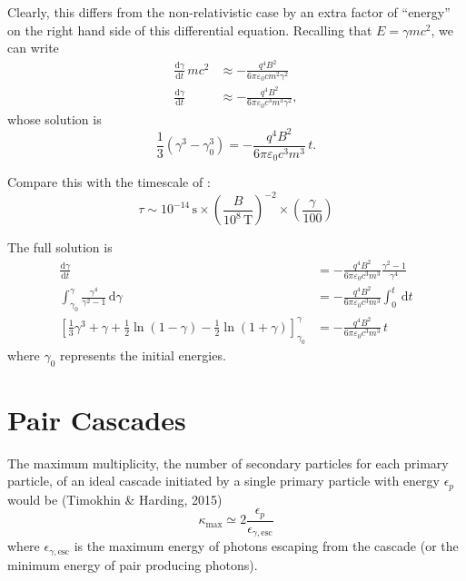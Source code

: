 \documentclass{book}
\newcommand{\deriv}[2]{\frac{\text{d}{#1}}{\text{d}{#2}}}
\begin{document}
Clearly, this differs from the non-relativistic case by an extra factor of ``energy'' on the right hand side of this differential equation.
Recalling that $E = \gamma mc^2$, we can write
\begin{equation}
\begin{aligned}
    \deriv{\gamma}{t}\,mc^2 &\approx -\frac{q^4B^2}{6\pi\varepsilon_0 c m^2 \gamma^2} \\
    \deriv{\gamma}{t} &\approx -\frac{q^4B^2}{6\pi\varepsilon_0 c^3 m^3 \gamma^2},
\end{aligned}
\end{equation}
whose solution is
\begin{equation}
    \frac{1}{3}(\gamma^3 - \gamma_0^3) = -\frac{q^4B^2}{6\pi\varepsilon_0 c^3 m^3}\,t.
\end{equation}

Compare this with the timescale of \citet{Luo1998}:
\begin{equation}
    \tau \sim 10^{-14}\,\text{s}
        \times \left(\frac{B}{10^8\,\text{T}}\right)^{-2}
        \times \left(\frac{\gamma}{100}\right)
\end{equation}

The full solution is
\begin{equation}
\begin{aligned}
    \deriv{\gamma}{t}
        &= -\frac{q^4B^2}{6\pi\varepsilon_0 c^3 m^3}\frac{\gamma^2 - 1}{\gamma^4} \\
    \int_{\gamma_0}^{\gamma} \frac{\gamma^4}{\gamma^2 - 1}\,\text{d}\gamma
        &= -\frac{q^4B^2}{6\pi\varepsilon_0 c^3 m^3} \int_0^t\,\text{d}t \\
    \left[ \frac{1}{3}\gamma^3 + \gamma + \frac{1}{2}\ln(1 - \gamma) - \frac{1}{2}\ln(1 + \gamma)\right]_{\gamma_0}^\gamma
        &= -\frac{q^4B^2}{6\pi\varepsilon_0 c^3 m^3}\,t
\end{aligned}
\end{equation}
where $\gamma_0$ represents the initial energies.

\section{Pair Cascades}

The maximum multiplicity, the number of secondary particles for each primary particle, of an ideal cascade initiated by a single primary particle with energy $\epsilon_p$ would be (Timokhin \& Harding, 2015)
\begin{equation}
    \kappa_\text{max} \simeq 2\frac{\epsilon_p}{\epsilon_{\gamma,\text{esc}}}
\end{equation}
where $\epsilon_{\gamma,\text{esc}}$ is the maximum energy of photons escaping from the cascade (or the minimum energy of pair producing photons).
\end{document}
